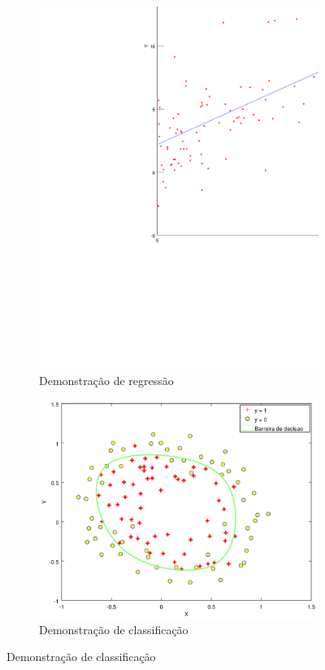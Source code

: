 \begin{figure}[!htb]
  \caption{Demonstração de problemas de aprendizado supervisionado}
  \begin{subfigure}[htb]{0.5\textwidth} 
    \includegraphics[width=\textwidth]{img/regressao2} 
    \caption{Demonstração de regressão} \label{fig:demregressao}
  \end{subfigure} 
  \begin{subfigure}[htb]{0.5\textwidth}
    \includegraphics[width=\textwidth]{img/classificacao2} 
    \caption{Demonstração de classificação} \label{fig:demclassificacao}
  \end{subfigure} 

\end{figure}
